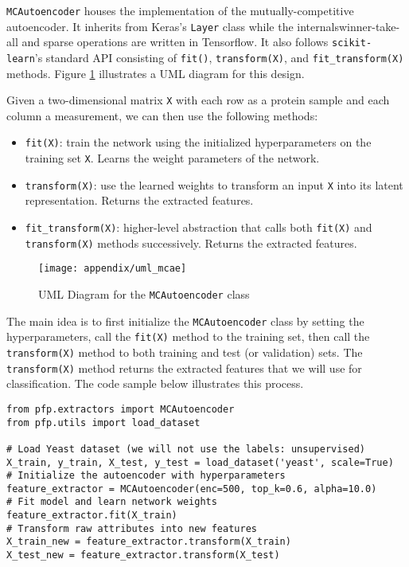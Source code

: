 \par \texttt{MCAutoencoder} houses the implementation of the
mutually-competitive autoencoder. It inherits from Keras's \texttt{Layer} class
while the internals\textemdash winner-take-all and sparse operations\textemdash
are written in Tensorflow. It also follows \texttt{scikit-learn}'s standard API
consisting of \texttt{fit()}, \texttt{transform(X)}, and
\texttt{fit\_transform(X)} methods.  Figure \ref{uml:mcae} illustrates a UML
diagram for this design. 

\par Given a two-dimensional matrix \texttt{X} with each row as a protein
sample and each column a measurement, we can then use the following methods:

\begin{itemize}
    \item \texttt{fit(X)}: train the network using the initialized
        hyperparameters on the training set \texttt{X}. Learns the weight
        parameters of the network.
    \item \texttt{transform(X)}: use the learned weights to transform an input
        \texttt{X} into its latent representation. Returns the extracted
        features.
    \item \texttt{fit\_transform(X)}: higher-level abstraction that calls both
        \texttt{fit(X)} and \texttt{transform(X)} methods successively. Returns
        the extracted features.
\end{itemize}

\begin{figure}[!h]
  \centering
    \texttt{[image: appendix/uml\_mcae]}
    \caption{UML Diagram for the \texttt{MCAutoencoder} class}
  \label{uml:mcae}
\end{figure}

\par The main idea is to first initialize the \texttt{MCAutoencoder} class by
setting the hyperparameters, call the \texttt{fit(X)} method to the training
set, then call the \texttt{transform(X)} method to both training and test (or
validation) sets. The \texttt{transform(X)} method returns the extracted
features that we will use for classification. The code sample below
illustrates this process.

\begin{lstlisting}[style=mypython, caption=Minimal example for extracting
protein features]
from pfp.extractors import MCAutoencoder
from pfp.utils import load_dataset

# Load Yeast dataset (we will not use the labels: unsupervised)
X_train, y_train, X_test, y_test = load_dataset('yeast', scale=True)
# Initialize the autoencoder with hyperparameters
feature_extractor = MCAutoencoder(enc=500, top_k=0.6, alpha=10.0)
# Fit model and learn network weights
feature_extractor.fit(X_train)
# Transform raw attributes into new features
X_train_new = feature_extractor.transform(X_train)
X_test_new = feature_extractor.transform(X_test)
\end{lstlisting}

